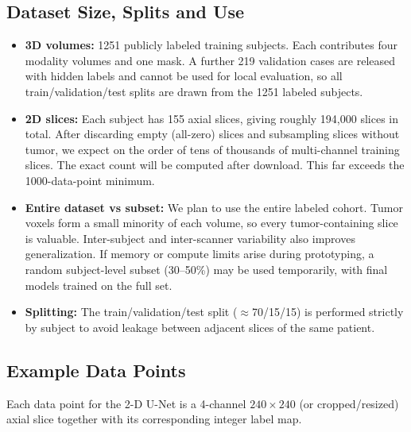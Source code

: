 \subsection{Dataset Size, Splits and Use}
\begin{itemize}
    \item \textbf{3D volumes:} 1251 publicly labeled training subjects. Each contributes four modality volumes and one mask. A further 219 validation cases are released with hidden labels and cannot be used for local evaluation, so all train/validation/test splits are drawn from the 1251 labeled subjects.
    \item \textbf{2D slices:} Each subject has 155 axial slices, giving roughly 194,000 slices in total. After discarding empty (all-zero) slices and subsampling slices without tumor, we expect on the order of tens of thousands of multi-channel training slices. The exact count will be computed after download. This far exceeds the 1000-data-point minimum.
    \item \textbf{Entire dataset vs subset:} We plan to use the entire labeled cohort. Tumor voxels form a small minority of each volume, so every tumor-containing slice is valuable. Inter-subject and inter-scanner variability also improves generalization. If memory or compute limits arise during prototyping, a random subject-level subset (30--50\%) may be used temporarily, with final models trained on the full set.
    \item \textbf{Splitting:} The train/validation/test split ($\approx$70/15/15) is performed strictly by subject to avoid leakage between adjacent slices of the same patient.
\end{itemize}

\subsection{Example Data Points}
Each data point for the 2-D U-Net is a 4-channel $240 \times 240$ (or cropped/resized) axial slice together with its corresponding integer label map.

